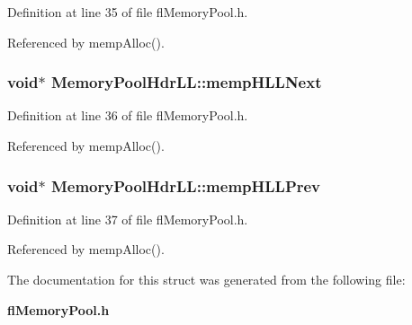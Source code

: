 Definition at line 35 of file fl\-Memory\-Pool.h.

Referenced by memp\-Alloc().
\subsubsection{\setlength{\rightskip}{0pt plus 5cm}void$\ast$ {\bf Memory\-Pool\-Hdr\-LL::memp\-HLLNext}}\label{structMemoryPoolHdrLL_3c81a0bdc7abc3de12fba9dac7aa6b22}




Definition at line 36 of file fl\-Memory\-Pool.h.

Referenced by memp\-Alloc().
\subsubsection{\setlength{\rightskip}{0pt plus 5cm}void$\ast$ {\bf Memory\-Pool\-Hdr\-LL::memp\-HLLPrev}}\label{structMemoryPoolHdrLL_061c8f1cf87bc43d0fda80cfa78d591a}




Definition at line 37 of file fl\-Memory\-Pool.h.

Referenced by memp\-Alloc().

The documentation for this struct was generated from the following file:\begin{CompactItemize}
\item 
{\bf fl\-Memory\-Pool.h}\end{CompactItemize}
